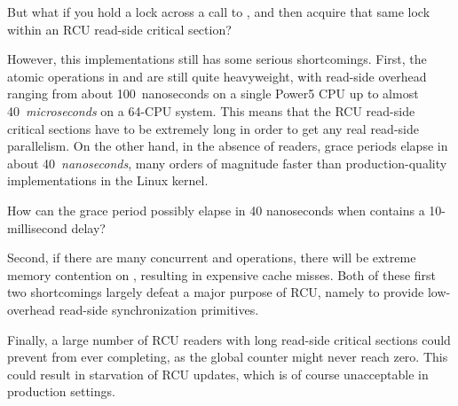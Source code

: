 \QuickQuiz{}
	But what if you hold a lock across a call to
	, and then acquire that same lock within
	an RCU read-side critical section?
 \QuickQuizEnd

However, this implementations still has some serious shortcomings.
First, the atomic operations in  and
 are still quite  heavyweight,
with read-side overhead ranging from about 100~nanoseconds on
a single Power5 CPU up to almost 40~\emph{microseconds}
on a 64-CPU system.
This means that the RCU read-side critical sections
have to be extremely long in order to get any real
read-side parallelism.
On the other hand, in the absence of readers, grace periods elapse
in about 40~\emph{nanoseconds}, many orders of magnitude faster
than production-quality implementations in the Linux kernel.

\QuickQuiz{}
	How can the grace period possibly elapse in 40 nanoseconds when
	 contains a 10-millisecond delay?
 \QuickQuizEnd

Second, if there are many concurrent 
and  operations, there will
be extreme memory contention on ,
resulting in expensive cache misses.
Both of these first two shortcomings largely defeat a major purpose of
RCU, namely to provide low-overhead read-side synchronization primitives.

Finally, a large number of RCU readers with long read-side
critical sections could prevent 
from ever completing, as the global counter might
never reach zero.
This could result in starvation of RCU updates, which
is of course unacceptable in production settings.

